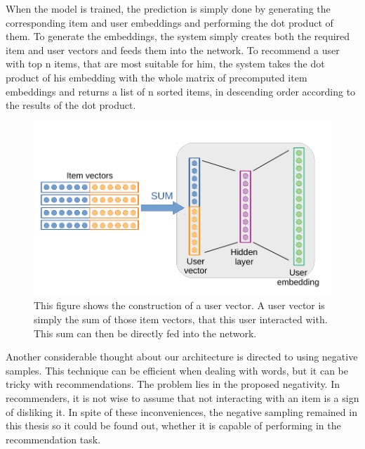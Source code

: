 When the model is trained, the prediction is simply done by generating the corresponding item and user embeddings and performing the dot product of them. To generate the embeddings, the system simply creates both the required item and user vectors and feeds them into the network. To recommend a user with top n items, that are most suitable for him, the system takes the dot product of his embedding with the whole matrix of precomputed item embeddings and returns a list of n sorted items, in descending order according to the results of the dot product. 


\begin{figure}[H]
    \centering
    \includegraphics{obrazky-figures/user_embeddings.pdf}
    \caption{This figure shows the construction of a user vector. A user vector is simply the sum of those item vectors, that this user interacted with. This sum can then be directly fed into the network.}
    \label{user_embed}
\end{figure}


Another considerable thought about our architecture is directed to using negative samples. This technique can be efficient when dealing with words, but it can be tricky with recommendations. The problem lies in the proposed negativity. In recommenders, it is not wise to assume that not interacting with an item is a sign of disliking it. In spite of these inconveniences, the negative sampling remained in this thesis so it could be found out, whether it is capable of performing in the recommendation task.



